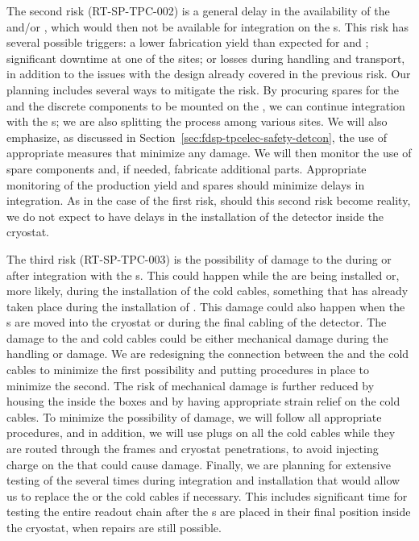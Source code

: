 The second risk (RT-SP-TPC-002) is a general delay in the availability of the 
and/or , which would then not be available for integration
on the s. This risk has several possible triggers: a lower fabrication yield 
than expected for  and ;
significant downtime at one of the  sites; or losses during 
handling and transport, in addition to the issues with the design already 
covered in the previous risk. Our planning includes several ways to mitigate the risk. By
procuring spares for the  and the discrete components to be mounted on the
, we can continue integration with the s;
we are also splitting the  process among various sites. We will also emphasize,
as discussed in Section~\ref{sec:fdsp-tpcelec-safety-detcon}, the use of appropriate
measures that minimize any  damage. We will then monitor the use
of spare components and, if needed, fabricate additional parts. Appropriate
monitoring of the production yield and spares should minimize
delays in  integration. As in the case of the first risk, should this
second risk become reality, we do not expect to have delays in the installation of the 
detector inside the cryostat. 
 
The third risk (RT-SP-TPC-003) is the possibility of damage to the 
 during or after integration with the s. This could
happen while the  are being installed or, more likely, during the
installation of the cold cables, something that has already taken place during
the installation of . This damage could also happen when the s are
moved into the cryostat or during the final cabling of the detector. The damage
to the  and cold cables could be either mechanical damage during the
handling or  damage. We are redesigning the connection between the 
and the cold cables to minimize the first possibility and putting procedures in place
to minimize the second. The risk of mechanical damage
is further reduced by housing the  inside the  boxes and by having 
appropriate strain relief on the cold cables. To minimize the possibility of
 damage, we will follow all appropriate procedures, and in addition,
we will use plugs on all the cold cables while they are routed through the
 frames and cryostat penetrations, to avoid injecting charge on
the  that could cause  damage. Finally, we are planning for
extensive testing of the  several times during integration
and installation that would allow us to replace the 
or the cold cables if necessary. This includes significant time for testing the entire readout 
chain after the s are placed in their final position inside the cryostat,
when repairs are still possible.

